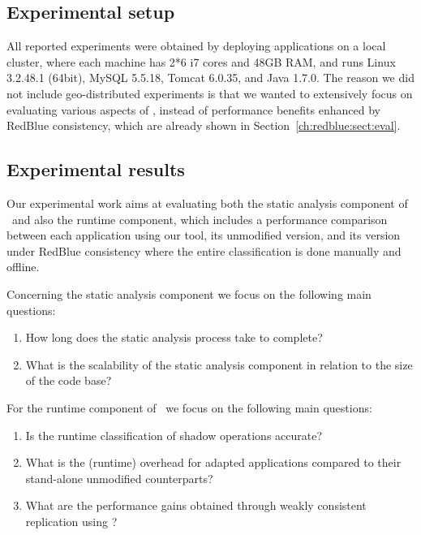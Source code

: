 \subsection{Experimental setup}
All reported experiments were obtained by deploying applications on a local cluster,
where each machine has
2*6 i7 cores and 48GB RAM, and runs Linux 3.2.48.1 (64bit), MySQL 5.5.18,
Tomcat 6.0.35, and Java 1.7.0. The reason we did not include
geo-distributed experiments is that we wanted
to extensively focus on evaluating various aspects of \tool, instead of
performance benefits enhanced by RedBlue consistency, which are already
shown in Section~\ref{ch:redblue:sect:eval}.

\subsection{Experimental results}
Our experimental work aims at evaluating both the static analysis component of \tool\ and also 
the runtime component, which includes a performance
comparison between each application using our tool, its unmodified version, and
its version under RedBlue consistency where the entire classification
is done manually and offline.

Concerning the static analysis component we focus on the following main questions: 
\begin{enumerate}
\item How long does the static analysis process take to complete?
\item What is the scalability of the static analysis component in relation to the size of the code base?
\end{enumerate}

For the runtime component of \tool\ we focus on the following main questions: 
\begin{enumerate}
\item Is the runtime classification of shadow operations accurate?
\item What is the (runtime) overhead for adapted applications compared to their stand-alone unmodified counterparts?
\item What are the performance gains obtained through weakly consistent replication using \tool?
\end{enumerate}



